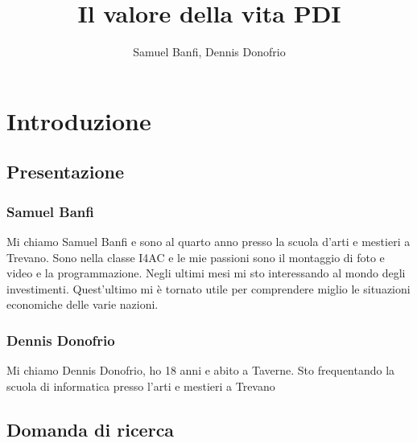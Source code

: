\documentclass[a4paper, 12pt]{article}
\title{Il valore della vita PDI}
\author{Samuel Banfi, Dennis Donofrio}
\date{}
\begin{document}
\maketitle

\pagebreak

\tableofcontents

\pagebreak

\onehalfspacing

\section{Introduzione}

\subsection{Presentazione}

\subsubsection{Samuel Banfi}

Mi chiamo Samuel Banfi e sono al quarto anno presso la scuola d'arti e mestieri a Trevano. Sono nella classe I4AC e le mie passioni sono il montaggio di foto e video e la programmazione. Negli ultimi mesi mi sto interessando al mondo degli investimenti. Quest'ultimo mi è tornato utile per comprendere miglio le situazioni economiche delle varie nazioni.

\subsubsection{Dennis Donofrio}

Mi chiamo Dennis Donofrio, ho 18 anni e abito a Taverne. Sto frequentando la scuola di informatica presso l'arti e mestieri a Trevano

\subsection{Domanda di ricerca}
\end{document}
